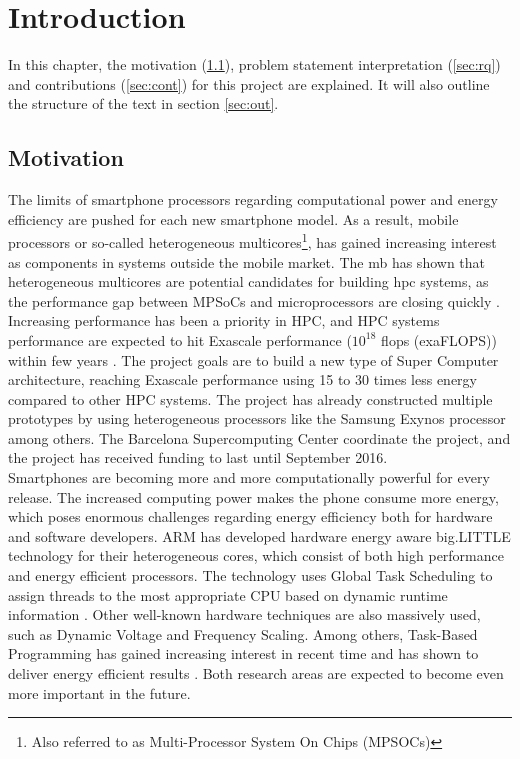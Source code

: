 \chapter{Introduction}
In this chapter, the motivation (\ref{sec:mot}), problem statement interpretation (\ref{sec:rq}) and contributions (\ref{sec:cont}) for this project are explained. It will also outline the structure of the text in section \ref{sec:out}.

\section{Motivation}
\label{sec:mot}
The limits of smartphone processors regarding computational power and energy efficiency are pushed for each new smartphone model. As a result, mobile processors or so-called heterogeneous multicores\footnote{Also referred to as Multi-Processor System On Chips (MPSOCs)}, has gained increasing interest as components in systems outside the mobile market. The \gls{mb} \cite{m:MB} has shown that heterogeneous multicores are potential candidates for building \gls{hpc} systems, as the performance gap between MPSoCs and microprocessors are closing quickly \cite{a:MB:Raj13}. Increasing performance has been a priority in HPC, and HPC systems performance are expected to hit Exascale performance ($10^{18}$ \gls{flops} (exaFLOPS)) within few years \cite{m:Top500}. The project goals are to build a new type of Super Computer architecture, reaching Exascale performance using 15 to 30 times less energy compared to other HPC systems. The project has already constructed multiple prototypes by using heterogeneous processors like the Samsung Exynos \cite{m:Exy} processor among others. The Barcelona Supercomputing Center coordinate the project, and the project has received funding to last until September 2016. \\

Smartphones are becoming more and more computationally powerful for every release. The increased computing power makes the phone consume more energy, which poses enormous challenges regarding energy efficiency both for hardware and software developers. ARM has developed hardware energy aware big.LITTLE technology for their heterogeneous cores, which consist of both high performance and energy efficient processors. The technology uses Global Task Scheduling to assign threads to the most appropriate CPU based on dynamic runtime information \cite{a:ARM:bL}. Other well-known hardware techniques are also massively used, such as Dynamic Voltage and Frequency Scaling. Among others, Task-Based Programming has gained increasing interest in recent time and has shown to deliver energy efficient results \cite{a:Lien2012}. Both research areas are expected to become even more important in the future. \\

